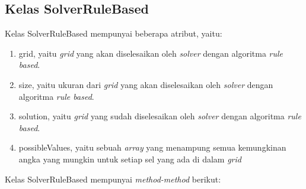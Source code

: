 \subsection{Kelas SolverRuleBased}
\label{sec:kelassolverrb}

Kelas SolverRuleBased mempunyai beberapa atribut, yaitu:

\begin{enumerate}
\item grid, yaitu \textit{grid} yang akan diselesaikan oleh \textit{solver} dengan algoritma \textit{rule based}.
\item size, yaitu ukuran dari \textit{grid} yang akan diselesaikan oleh \textit{solver} dengan algoritma \textit{rule based}.
\item solution, yaitu \textit{grid} yang sudah diselesaikan oleh \textit{solver} dengan algoritma \textit{rule based}.
\item possibleValues, yaitu sebuah \textit{array} yang menampung semua kemungkinan angka yang mungkin untuk setiap sel yang ada di dalam \textit{grid}
\end{enumerate}

\clearpage

Kelas SolverRuleBased mempunyai \textit{method-method} berikut:

